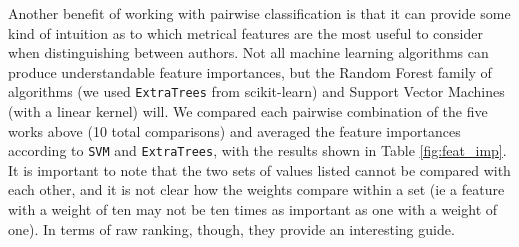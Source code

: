 \documentclass[11pt,a4paper]{scrartcl} %
\begin{document}
Another benefit of working with pairwise classification is that it can provide some kind of intuition as to which metrical features are the most useful to consider when distinguishing between authors. Not all machine learning algorithms can produce understandable feature importances, but the Random Forest family of algorithms (we used \texttt{ExtraTrees} from scikit-learn) and Support Vector Machines (with a linear kernel) will. We compared each pairwise combination of the five works above (10 total comparisons) and averaged the feature importances according to \texttt{SVM} and \texttt{ExtraTrees}, with the results shown in Table \ref{fig:feat_imp}. It is important to note that the two sets of values listed cannot be compared with each other, and it is not clear how the weights compare within a set (ie a feature with a weight of ten may not be ten times as important as one with a weight of one). In terms of raw ranking, though, they provide an interesting guide. 
\begin{table}
\caption{Ranked Feature Importances, as determined by \texttt{ExtraTrees} and \texttt{SVM}}
\label{fig:feat_imp}
\phantom{x}
\centering
{}
\end{table}
\end{document}
